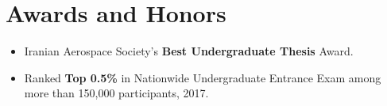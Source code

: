 \documentclass[letterpaper,11pt]{article}
\makeatletter
\newcommand{\resumeItem}[1]{
  \item\small{
    {#1 \vspace{-2pt}}
  }
}
\newcommand{\resumeSubheading}[4]{
  \vspace{-2pt}\item
    \begin{tabular*}{1.0\textwidth}[t]{l@{\extracolsep{\fill}}r}
      \textbf{ #1} & \textbf{\small #2} \\
      \textsl{\small #3} & \textit{\small #4} \\
    \end{tabular*}\vspace{-7pt}
}
\newcommand{\resumeProjectHeading}[2]{
    \item
    \begin{tabular*}{1.001\textwidth}{l@{\extracolsep{\fill}}r}
      \small#1 & \textbf{\small #2}\\
    \end{tabular*}\vspace{-7pt}
}
\newcommand{\resumeSubHeadingListEnd}{\end{itemize}}
\newcommand{\resumeItemListStart}{\begin{itemize}}
\newcommand{\resumeItemListEnd}{\end{itemize}\vspace{-5pt}}
\makeatother
\begin{document}














 \section{Awards and Honors}
 \resumeItemListStart
 \resumeItem{Iranian Aerospace Society’s \textbf{Best Undergraduate Thesis} Award.}
 \vspace{-6pt}
 \resumeItem{Ranked \textbf{Top 0.5\%} in Nationwide Undergraduate Entrance Exam among more than 150,000 participants,
 	2017.}
 \resumeItemListEnd
 \vspace{-16pt}
\end{document}
